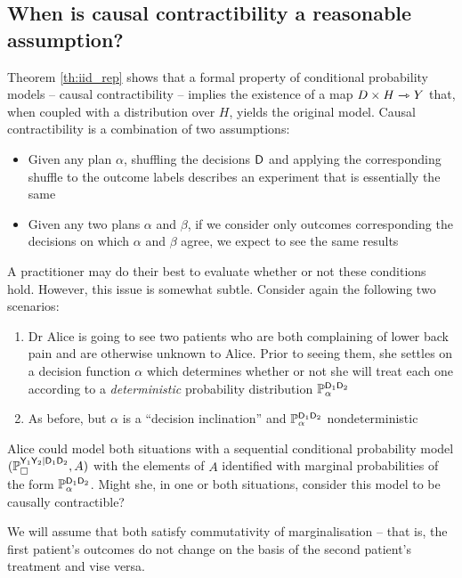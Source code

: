 \subsection{When is causal contractibility a reasonable assumption?}

Theorem \ref{th:iid_rep} shows that a formal property of conditional probability models -- causal contractibility -- implies the existence of a map $D\times H\rightarrowtriangle Y$ that, when coupled with a distribution over $H$, yields the original model. Causal contractibility is a combination of two assumptions:
\begin{itemize}
    \item Given any plan $\alpha$, shuffling the decisions $\mathsf{D}$ and applying the corresponding shuffle to the outcome labels describes an experiment that is essentially the same
    \item Given any two plans $\alpha$ and $\beta$, if we consider only outcomes corresponding the decisions on which $\alpha$ and $\beta$ agree, we expect to see the same results
\end{itemize}

A practitioner may do their best to evaluate whether or not these conditions hold. However, this issue is somewhat subtle. Consider again the following two scenarios:

\begin{enumerate}
    \item Dr Alice is going to see two patients who are both complaining of lower back pain and are otherwise unknown to Alice. Prior to seeing them, she settles on a decision function $\alpha$ which determines whether or not she will treat each one according to a \emph{deterministic} probability distribution $\mathbb{P}_\alpha^{\mathsf{D}_1\mathsf{D}_2}$ 
    \item As before, but $\alpha$ is a ``decision inclination'' and $\mathbb{P}_\alpha^{\mathsf{D}_1\mathsf{D}_2}$ nondeterministic
\end{enumerate}

Alice could model both situations with a sequential conditional probability model $(\mathbb{P}_\square^{\mathsf{Y}_1\mathsf{Y}_2|\mathsf{D}_1\mathsf{D}_2},A)$ with the elements of $A$ identified with marginal probabilities of the form $\mathbb{P}_\alpha^{\mathsf{D}_1\mathsf{D}_2}$. Might she, in one or both situations, consider this model to be causally contractible?

We will assume that both satisfy commutativity of marginalisation -- that is, the first patient's outcomes do not change on the basis of the second patient's treatment and vise versa.


